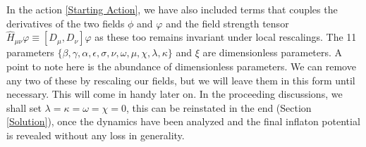 \documentclass[aps,prd,reprint,preprintnumbers,showpacs,floatfix,nofootinbib,superscript address]{revtex4-2}
\begin{document}
In the action \ref{Starting Action}, we have also included terms that couples the derivatives of the two fields $\phi$ and $\varphi$ and the field strength tensor $\hat{H}_{\mu\nu}\varphi \equiv [D_\mu,D_\nu]\varphi$ as these too remains invariant under local rescalings. The 11 parameters $\{\beta, \gamma, \alpha, \epsilon, \sigma, \nu, \omega, \mu, \chi ,\lambda, \kappa\}$ and $\xi$ are dimensionless parameters. A point to note here is the abundance of dimensionless parameters. We can remove any two of these by rescaling our fields, but we will leave them in this form until necessary. This will come in handy later on. In the proceeding discussions, we shall set $\lambda = \kappa = \omega = \chi= 0$, this can be reinstated in the end (Section \ref{Solution}), once the dynamics have been analyzed and the final inflaton potential is revealed without any loss in generality.
\end{document}

